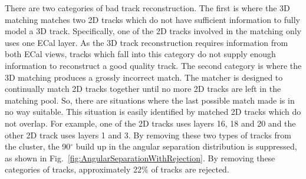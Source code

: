 There are two categories of bad track reconstruction.  The first is where the 3D matching matches two 2D tracks which do not have sufficient information to fully model a 3D track.  Specifically, one of the 2D tracks involved in the matching only uses one ECal layer.  As the 3D track reconstruction requires information from both ECal views, tracks which fall into this category do not supply enough information to reconstruct a good quality track.  The second category is where the 3D matching produces a grossly incorrect match.  The matcher is designed to continually match 2D tracks together until no more 2D tracks are left in the matching pool.  So, there are situations where the last possible match made is in no way suitable.  This situation is easily identified by matched 2D tracks which do not overlap.  For example, one of the 2D tracks uses layers 16, 18 and 20 and the other 2D track uses layers 1 and 3.  By removing these two types of tracks from the cluster, the 90$^\circ$ build up in the angular separation distribution is suppressed, as shown in Fig.~\ref{fig:AngularSeparationWithRejection}.  By removing these categories of tracks, approximately 22$\%$ of tracks are rejected.
\newline
\newline
